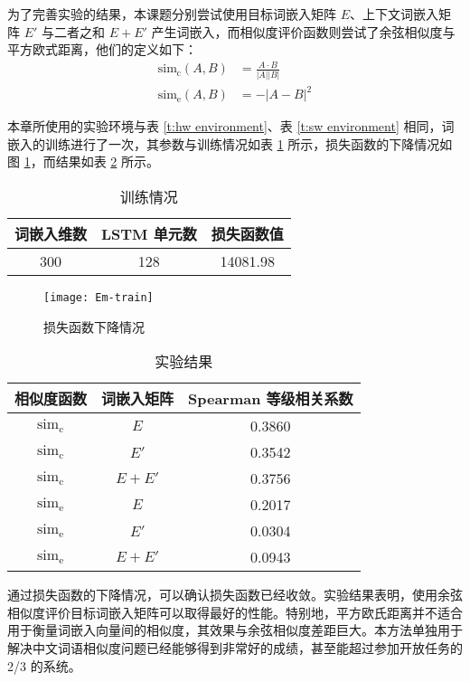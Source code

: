 为了完善实验的结果，本课题分别尝试使用目标词嵌入矩阵 $E$、上下文词嵌入矩阵 $E'$ 与二者之和 $E + E'$ 产生词嵌入，而相似度评价函数则尝试了余弦相似度与平方欧式距离，他们的定义如下：
\begin{align}
\text{sim}_\text{c}(A, B) & = \frac{A \cdot B}{|A| |B|} \\
\text{sim}_\text{e}(A, B) & = -|A - B|^2
\end{align}

本章所使用的实验环境与表 \ref{t:hw environment}、表 \ref{t:sw environment} 相同，词嵌入的训练进行了一次，其参数与训练情况如表 \ref{t:embedding train} 所示，损失函数的下降情况如图 \ref{f:embedding loss}，而结果如表 \ref{t:embedding result} 所示。

\begin{table}[h]
	\caption{训练情况}
	\label{t:embedding train}
	\vspace{0.5em}\centering\wuhao
	\begin{tabular}{ccc}
		\toprule[1.5pt]
		词嵌入维数 & LSTM 单元数 & 损失函数值 \\
		\midrule[1pt]
		300 & 128 & 14081.98 \\
		\bottomrule[1.5pt]
	\end{tabular}
\end{table}

\begin{figure}[h]
	\centering
	\texttt{[image: Em-train]}
	\caption{损失函数下降情况}
	\label{f:embedding loss}
	\vspace{-1em}
\end{figure}

\begin{table}[h]
\caption{实验结果}
\label{t:embedding result}
\vspace{0.5em}\centering\wuhao
\begin{tabular}{ccc}
	\toprule[1.5pt]
	相似度函数 & 词嵌入矩阵 & Spearman 等级相关系数 \\
	\midrule[1pt]
	$\text{sim}_\text{c}$ & $E$ & 0.3860 \\
	$\text{sim}_\text{c}$ & $E'$ &  0.3542 \\
	$\text{sim}_\text{c}$ & $E + E'$ & 0.3756 \\
	$\text{sim}_\text{e}$ & $E$ &  0.2017 \\
	$\text{sim}_\text{e}$ & $E'$ & 0.0304 \\
	$\text{sim}_\text{e}$ & $E + E'$ & 0.0943 \\
	\bottomrule[1.5pt]
\end{tabular}
\end{table}

通过损失函数的下降情况，可以确认损失函数已经收敛。实验结果表明，使用余弦相似度评价目标词嵌入矩阵可以取得最好的性能。特别地，平方欧氏距离并不适合用于衡量词嵌入向量间的相似度，其效果与余弦相似度差距巨大。本方法单独用于解决中文词语相似度问题已经能够得到非常好的成绩，甚至能超过参加开放任务的 2/3 的系统。